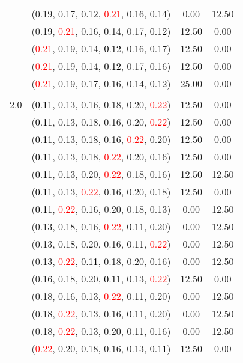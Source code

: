 \documentclass[10pt,a4paper]{report}
\begin{document}
\begin{center}
\begin{longtable}{clcc}
			&(0.19, 0.17, \textcolor{black}{0.12}, \textcolor{red}{0.21}, 0.16, 0.14)&0.00&12.50\\
			&(0.19, \textcolor{red}{0.21}, 0.16, 0.14, 0.17, \textcolor{black}{0.12})&12.50&0.00\\
			&(\textcolor{red}{0.21}, 0.19, 0.14, \textcolor{black}{0.12}, 0.16, 0.17)&12.50&0.00\\
			&(\textcolor{red}{0.21}, 0.19, 0.14, \textcolor{black}{0.12}, 0.17, 0.16)&12.50&0.00\\
			&(\textcolor{red}{0.21}, 0.19, 0.17, 0.16, 0.14, \textcolor{black}{0.12})&25.00&0.00\\
		&&&\\
		2.0			&(\textcolor{black}{0.11}, 0.13, 0.16, 0.18, 0.20, \textcolor{red}{0.22})&12.50&0.00\\
			&(\textcolor{black}{0.11}, 0.13, 0.18, 0.16, 0.20, \textcolor{red}{0.22})&12.50&0.00\\
			&(\textcolor{black}{0.11}, 0.13, 0.18, 0.16, \textcolor{red}{0.22}, 0.20)&12.50&0.00\\
			&(\textcolor{black}{0.11}, 0.13, 0.18, \textcolor{red}{0.22}, 0.20, 0.16)&12.50&0.00\\
			&(\textcolor{black}{0.11}, 0.13, 0.20, \textcolor{red}{0.22}, 0.18, 0.16)&12.50&12.50\\
			&(\textcolor{black}{0.11}, 0.13, \textcolor{red}{0.22}, 0.16, 0.20, 0.18)&12.50&0.00\\
			&(\textcolor{black}{0.11}, \textcolor{red}{0.22}, 0.16, 0.20, 0.18, 0.13)&0.00&12.50\\
			&(0.13, 0.18, 0.16, \textcolor{red}{0.22}, \textcolor{black}{0.11}, 0.20)&0.00&12.50\\
			&(0.13, 0.18, 0.20, 0.16, \textcolor{black}{0.11}, \textcolor{red}{0.22})&0.00&12.50\\
			&(0.13, \textcolor{red}{0.22}, \textcolor{black}{0.11}, 0.18, 0.20, 0.16)&0.00&12.50\\
			&(0.16, 0.18, 0.20, \textcolor{black}{0.11}, 0.13, \textcolor{red}{0.22})&12.50&0.00\\
			&(0.18, 0.16, 0.13, \textcolor{red}{0.22}, \textcolor{black}{0.11}, 0.20)&0.00&12.50\\
			&(0.18, \textcolor{red}{0.22}, 0.13, 0.16, \textcolor{black}{0.11}, 0.20)&0.00&12.50\\
			&(0.18, \textcolor{red}{0.22}, 0.13, 0.20, \textcolor{black}{0.11}, 0.16)&0.00&12.50\\
			&(\textcolor{red}{0.22}, 0.20, 0.18, 0.16, 0.13, \textcolor{black}{0.11})&12.50&0.00\\

\end{longtable}
\end{center}
\end{document}
